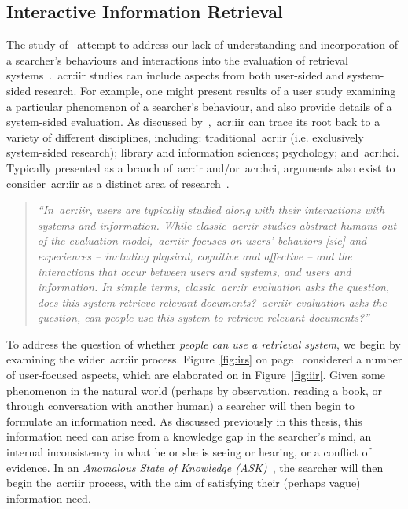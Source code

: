 \subsection{Interactive Information Retrieval}\label{sec:ir_background:user:iir}
The study of~ attempt to address our lack of understanding and incorporation of a searcher's behaviours and interactions into the evaluation of retrieval systems~\citep{callan2007minds}.~\gls{acr:iir} studies can include aspects from both user-sided and system-sided research. For example, one might present results of a user study examining a particular phenomenon of a searcher's behaviour, and also provide details of a system-sided evaluation. As discussed by~\cite{kelly2009iir},~\gls{acr:iir} can trace its root back to a variety of different disciplines, including: traditional~\gls{acr:ir} (i.e. exclusively system-sided research); library and information sciences; psychology; and~\gls{acr:hci}. Typically presented as a branch of~\gls{acr:ir} and/or~\gls{acr:hci}, arguments also exist to consider~\gls{acr:iir} as a distinct area of research~\citep{ruthven2008iir}.

\begin{quote}
\emph{``In~\gls{acr:iir}, users are typically studied along with their interactions with systems and information. While classic~\gls{acr:ir} studies abstract humans out of the evaluation model,~\gls{acr:iir} focuses on users' behaviors [sic] and experiences -- including physical, cognitive and affective -- and the interactions that occur between users and systems, and users and information. In simple terms, classic~\gls{acr:ir} evaluation asks the question, does this system retrieve relevant documents?~\gls{acr:iir} evaluation asks the question, can people use this system to retrieve relevant documents?''}
\end{quote}

To address the question of whether \emph{people can use a retrieval system}, we begin by examining the wider~\gls{acr:iir} process. Figure~\ref{fig:irs} on page~\pageref{fig:irs} considered a number of user-focused aspects, which are elaborated on in Figure~\ref{fig:iir}. Given some phenomenon in the natural world (perhaps by observation, reading a book, or through conversation with another human) a searcher will then begin to formulate an information need. As discussed previously in this thesis, this information need can arise from a knowledge gap in the searcher's mind, an internal inconsistency in what he or she is seeing or hearing, or a conflict of evidence. In an \emph{Anomalous State of Knowledge (ASK)}~\citep{belkin1980ask}, the searcher will then begin the~\gls{acr:iir} process, with the aim of satisfying their (perhaps vague) information need.

